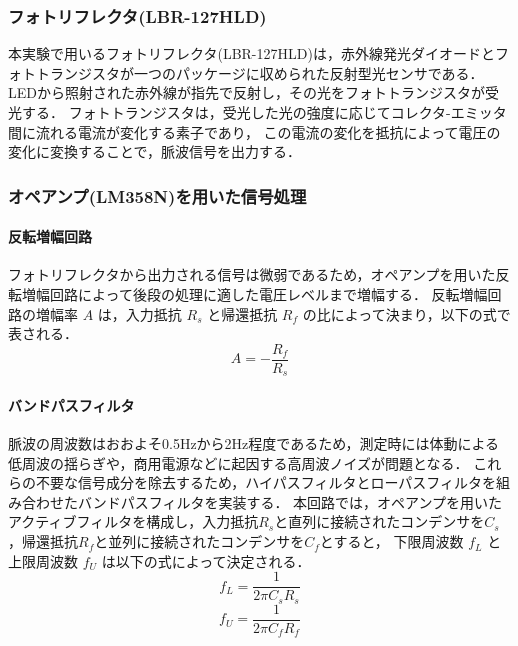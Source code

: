 \subsubsection{フォトリフレクタ(LBR-127HLD)}
本実験で用いるフォトリフレクタ(LBR-127HLD)は，赤外線発光ダイオードとフォトトランジスタが一つのパッケージに収められた反射型光センサである\cite{LBR-127HLD}．
LEDから照射された赤外線が指先で反射し，その光をフォトトランジスタが受光する．
フォトトランジスタは，受光した光の強度に応じてコレクタ-エミッタ間に流れる電流が変化する素子であり\cite{workA_フォトトランジスタ}，
この電流の変化を抵抗によって電圧の変化に変換することで，脈波信号を出力する．


\subsubsection{オペアンプ(LM358N)を用いた信号処理}
\paragraph{反転増幅回路}
フォトリフレクタから出力される信号は微弱であるため，オペアンプを用いた反転増幅回路によって後段の処理に適した電圧レベルまで増幅する．
反転増幅回路の増幅率 $A$ は，入力抵抗 $R_s$ と帰還抵抗 $R_f$ の比によって決まり，以下の式で表される\cite{workA_オペアンプ}．
\begin{equation}
  A = - \frac{R_f}{R_s} \label{eq:A}
\end{equation}

\paragraph{バンドパスフィルタ}
脈波の周波数はおおよそ0.5Hzから2Hz程度であるため，測定時には体動による低周波の揺らぎや，商用電源などに起因する高周波ノイズが問題となる\cite{workA_脈拍周波数}．
これらの不要な信号成分を除去するため，ハイパスフィルタとローパスフィルタを組み合わせたバンドパスフィルタを実装する．
本回路では，オペアンプを用いたアクティブフィルタを構成し，入力抵抗$R_s$と直列に接続されたコンデンサを$C_s$，帰還抵抗$R_f$と並列に接続されたコンデンサを$C_f$とすると，
下限周波数 $f_L$ と上限周波数 $f_U$ は以下の式によって決定される\cite{workA_バンドパスフィルタ}．
\begin{equation}
  f_L = \frac{1}{2\pi C_s R_s} \label{eq:f_L}
\end{equation}
\begin{equation}
  f_U = \frac{1}{2\pi C_f R_f} \label{eq:f_U}
\end{equation}




